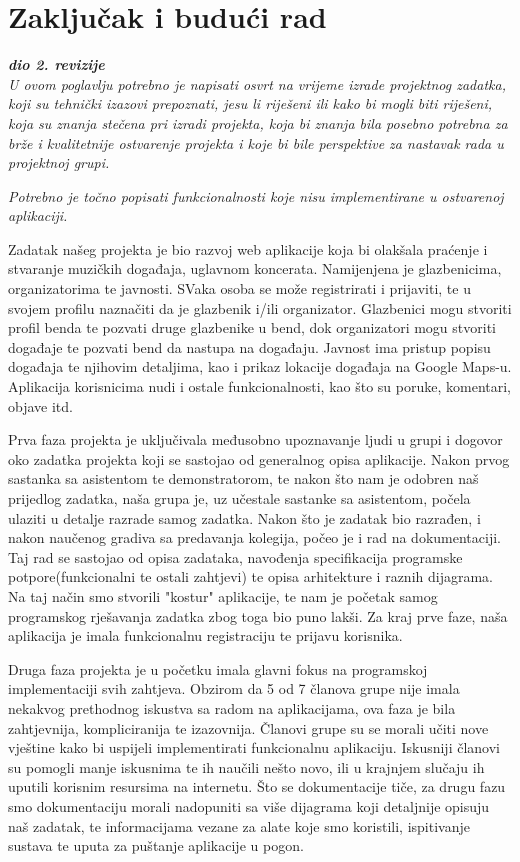 \label{key}\chapter{Zaključak i budući rad}
		
		\textbf{\textit{dio 2. revizije}}\\
		
		 \textit{U ovom poglavlju potrebno je napisati osvrt na vrijeme izrade projektnog zadatka, koji su tehnički izazovi prepoznati, jesu li riješeni ili kako bi mogli biti riješeni, koja su znanja stečena pri izradi projekta, koja bi znanja bila posebno potrebna za brže i kvalitetnije ostvarenje projekta i koje bi bile perspektive za nastavak rada u projektnoj grupi.}
		
		 \textit{Potrebno je točno popisati funkcionalnosti koje nisu implementirane u ostvarenoj aplikaciji.}
		 
		 Zadatak našeg projekta je bio razvoj web aplikacije koja bi olakšala praćenje i stvaranje muzičkih događaja, uglavnom koncerata. Namijenjena je glazbenicima, organizatorima te javnosti. SVaka osoba se može registrirati i prijaviti, te u svojem profilu naznačiti da je glazbenik i/ili organizator. Glazbenici mogu stvoriti profil benda te pozvati druge glazbenike u bend, dok organizatori mogu stvoriti događaje te pozvati bend da nastupa na događaju. Javnost ima pristup popisu događaja te njihovim detaljima, kao i prikaz lokacije događaja na Google Maps-u. Aplikacija korisnicima nudi i ostale funkcionalnosti, kao što su poruke, komentari, objave itd.
		 
		 Prva faza projekta je uključivala međusobno upoznavanje ljudi u grupi i dogovor oko zadatka projekta koji se sastojao od generalnog opisa aplikacije. Nakon prvog sastanka sa asistentom te demonstratorom, te nakon što nam je odobren naš prijedlog zadatka, naša grupa je, uz učestale sastanke sa asistentom, počela ulaziti u detalje razrade samog zadatka. Nakon što je zadatak bio razrađen, i nakon naučenog gradiva sa predavanja kolegija, počeo je i rad na dokumentaciji. Taj rad se sastojao od opisa zadataka, navođenja specifikacija programske potpore(funkcionalni te ostali zahtjevi) te opisa arhitekture i raznih dijagrama. Na taj način smo stvorili "kostur" aplikacije, te nam je početak samog programskog rješavanja zadatka zbog toga bio puno lakši. Za kraj prve faze, naša aplikacija je imala funkcionalnu registraciju te prijavu korisnika.
		 
		 Druga faza projekta je u početku imala glavni fokus na programskoj implementaciji svih zahtjeva. Obzirom da 5 od 7 članova grupe nije imala nekakvog prethodnog iskustva sa radom na aplikacijama, ova faza je bila zahtjevnija, kompliciranija te izazovnija. Članovi grupe su se morali učiti nove vještine kako bi uspijeli implementirati funkcionalnu aplikaciju. Iskusniji članovi su pomogli manje iskusnima te ih naučili nešto novo, ili u krajnjem slučaju ih uputili korisnim resursima na internetu. Što se dokumentacije tiče, za drugu fazu smo dokumentaciju morali nadopuniti sa više dijagrama koji detaljnije opisuju naš zadatak, te informacijama vezane za alate koje smo koristili, ispitivanje sustava te uputa za puštanje aplikacije u pogon.
		 
